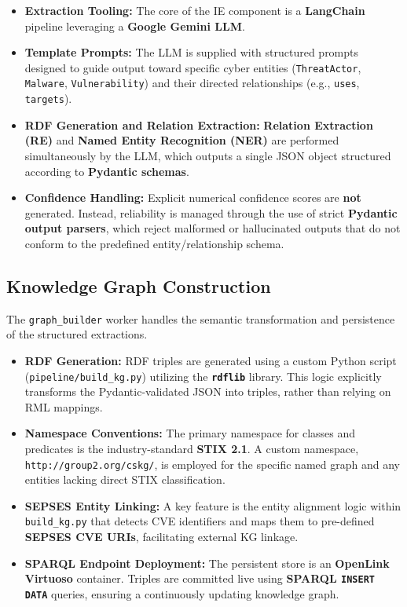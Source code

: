 \begin{itemize}
    \item \textbf{Extraction Tooling:} The core of the IE component is a \textbf{LangChain} pipeline leveraging a \textbf{Google Gemini LLM}.
    \item \textbf{Template Prompts:} The LLM is supplied with structured prompts designed to guide output toward specific cyber entities (\texttt{ThreatActor}, \texttt{Malware}, \texttt{Vulnerability}) and their directed relationships (e.g., \texttt{uses}, \texttt{targets}).
    \item \textbf{RDF Generation and Relation Extraction:} \textbf{Relation Extraction (RE)} and \textbf{Named Entity Recognition (NER)} are performed simultaneously by the LLM, which outputs a single JSON object structured according to \textbf{Pydantic schemas}.
    \item \textbf{Confidence Handling:} Explicit numerical confidence scores are \textbf{not} generated. Instead, reliability is managed through the use of strict \textbf{Pydantic output parsers}, which reject malformed or hallucinated outputs that do not conform to the predefined entity/relationship schema.
\end{itemize}

\subsection{Knowledge Graph Construction}
The \texttt{graph\_builder} worker handles the semantic transformation and persistence of the structured extractions.

\begin{itemize}
    \item \textbf{RDF Generation:} RDF triples are generated using a custom Python script (\texttt{pipeline/build\_kg.py}) utilizing the \textbf{\texttt{rdflib}} library. This logic explicitly transforms the Pydantic-validated JSON into triples, rather than relying on RML mappings.
    \item \textbf{Namespace Conventions:} The primary namespace for classes and predicates is the industry-standard \textbf{STIX 2.1}. A custom namespace, \texttt{http://group2.org/cskg/}, is employed for the specific named graph and any entities lacking direct STIX classification.
    \item \textbf{SEPSES Entity Linking:} A key feature is the entity alignment logic within \texttt{build\_kg.py} that detects CVE identifiers and maps them to pre-defined \textbf{SEPSES CVE URIs}, facilitating external KG linkage.
    \item \textbf{SPARQL Endpoint Deployment:} The persistent store is an \textbf{OpenLink Virtuoso} container. Triples are committed live using \textbf{SPARQL \texttt{INSERT DATA}} queries, ensuring a continuously updating knowledge graph.
\end{itemize}